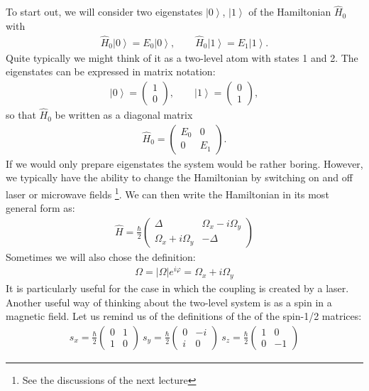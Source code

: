 \documentclass[10pt]{article}
\newcommand{\ket}[1]{\ensuremath{\left|#1\right\rangle}}
\begin{document}
To start out, we will consider two eigenstates $\ket{0}$, $\ket{1}$ of the Hamiltonian $\hat{H}_0$ with
\begin{align}
 \hat{H}_0\ket{0}=E_0\ket{0}, \qquad \hat{H}_0\ket{1}=E_1\ket{1}.
\end{align}
Quite typically we might think of it as a two-level atom with states 1 and 2. The eigenstates can be expressed in matrix notation:
\begin{align}
 \ket{0}=\left( \begin{array}{c} 1 \\ 0 \end{array} \right), \qquad \ket{1}=\left( \begin{array}{c} 0 \\ 1 \end{array} \right),
\end{align}
so that $\hat{H}_0$ be written as a diagonal matrix
\begin{align}
    \hat{H}_0 = \left(\begin{array}{cc} E_0 & 0 \\ 0 & E_1 \end{array}\right).
\end{align}
If we would only prepare eigenstates the system would be rather boring. However, we typically have the ability to change the Hamiltonian by switching on and off laser or microwave fields \footnote{See the discussions of the next lecture}. We can then write the Hamiltonian in its most general form as:
\begin{align}\label{Eq:TwoLevelGeneral}
\hat{H} = \frac{\hbar}{2}\left( \begin{array}{cc} \Delta  & \Omega_x - i\Omega_y\\ \Omega_x +i\Omega_y & -\Delta \end{array} \right)
\end{align}
Sometimes we will also chose the definition:
\begin{align}
\Omega = |\Omega| e^{i\varphi}=\Omega_x + i\Omega_y
\end{align}
It is particularly useful for the case in which the coupling is created by a laser. Another useful way of thinking about the two-level system is as a spin in a magnetic field. Let us remind us of the definitions of the of the spin-1/2 matrices:
\begin{align}
s_x = \frac{\hbar}{2}\left(\begin{array}{cc}
0 & 1\\
1 &  0
\end{array}
\right)~
s_y = \frac{\hbar}{2}\left(\begin{array}{cc}
0 & -i\\
i &  0
\end{array}
\right)~s_z =\frac{\hbar}{2} \left(\begin{array}{cc}
1 & 0\\
0 &  -1
\end{array}
\right)
\end{align}
\end{document}
